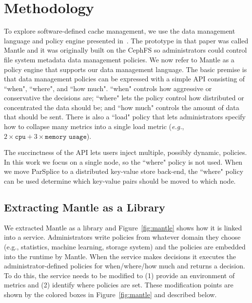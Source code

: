 \section{Methodology}

To explore software-defined cache management, we use
the data management language and policy engine presented
in~\cite{sevilla:sc15-mantle}. The prototype in that paper was called Mantle
and it was originally built on the CephFS so administrators could control file
system metadata data management policies. We now refer to Mantle as a policy
engine that supports our data management language.  The basic premise is that
data management policies can be expressed with a simple API consisting of
``when", ``where", and ``how much". ``when" controls how aggressive or
conservative the decisions are; ``where" lets the policy control how
distributed or concentrated the data should be; and ``how much" controls the
amount of data that should be sent. There is also a ``load" policy that lets
administrators specify how to collapse many metrics into a single load metric
({\it e.g.}, \(2\times\texttt{cpu} + 3\times\texttt{memory usage}\)).

The succinctness of the API lets users inject multiple, possibly dynamic, policies. In
this work we focus on a single node, so the ``where" policy is not used. When
we move ParSplice to a distributed key-value store back-end, the ``where" policy
can be used determine which key-value pairs should be moved to which node.

\subsection{Extracting Mantle as a Library}
\label{sec:extracting}


We extracted Mantle as a library and Figure~\ref{fig:mantle} shows how it is
linked into a service.  Administrators write policies from whatever domain they
choose ({e.g.}, statistics, machine learning, storage system) and the policies
are embedded into the runtime by Mantle. When the service makes decisions it
executes the administrator-defined policies for when/where/how much and returns
a decision.  To do this, the service needs to be modified to (1) provide an
environment of metrics and (2) identify where policies are set. These
modification points are shown by the colored boxes in Figure~\ref{fig:mantle}
and described below.

